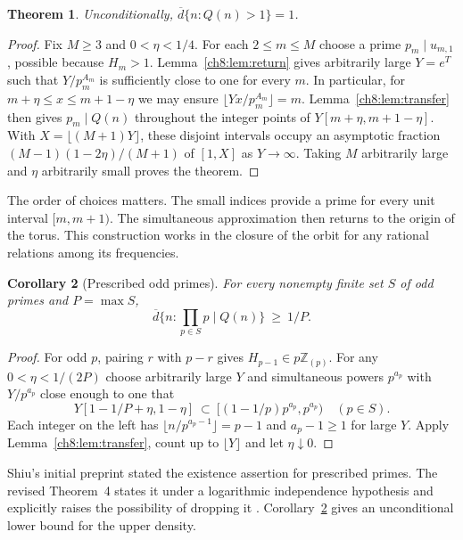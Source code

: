 \documentclass[11pt,a4paper,oneside,openany]{report}
\newtheorem{theorem}{Theorem}[section]
\newtheorem{corollary}[theorem]{Corollary}
\theoremstyle{remark}\newtheorem{remark}[theorem]{Remark}
\numberwithin{equation}{section}
\newcommand{\Z}{\mathbb Z}\newcommand{\N}{\mathbb N}
\newcommand{\dens}{\overline d}\newcommand{\lcm}{\operatorname{lcm}}
\begin{document}
\begin{theorem}\label{ch8:thm:wu}
Unconditionally, $\dens\{n:Q(n)>1\}=1$.
\end{theorem}
\begin{proof}
Fix $M\ge3$ and $0<\eta<1/4$. For each $2\le m\le M$ choose a prime $p_m\mid u_{m,1}$, possible because $H_m>1$. Lemma~\ref{ch8:lem:return} gives arbitrarily large $Y=e^T$ such that $Y/p_m^{A_m}$ is sufficiently close to one for every $m$. In particular, for $m+\eta\le x\le m+1-\eta$ we may ensure
$\lfloor Yx/p_m^{A_m}\rfloor=m$. Lemma~\ref{ch8:lem:transfer} then gives $p_m\mid Q(n)$ throughout the integer points of $Y[m+\eta,m+1-\eta]$. With $X=\lfloor(M+1)Y\rfloor$, these disjoint intervals occupy an asymptotic fraction $(M-1)(1-2\eta)/(M+1)$ of $[1,X]$ as $Y\to\infty$. Taking $M$ arbitrarily large and $\eta$ arbitrarily small proves the theorem.
\end{proof}

The order of choices matters. The small indices provide a prime for every unit interval $[m,m+1)$. The simultaneous approximation then returns to the origin of the torus. This construction works in the closure of the orbit for any rational relations among its frequencies.

\begin{corollary}[Prescribed odd primes]\label{ch8:cor:shiu}
For every nonempty finite set $S$ of odd primes and $P=\max S$,
\[
 \dens\{n:\textstyle\prod_{p\in S}p\mid Q(n)\}\ \ge\ 1/P .
\]
\end{corollary}
\begin{proof}
For odd $p$, pairing $r$ with $p-r$ gives $H_{p-1}\in p\Z_{(p)}$. For any $0<\eta<1/(2P)$ choose arbitrarily large $Y$ and simultaneous powers $p^{a_p}$ with $Y/p^{a_p}$ close enough to one that
\[
  Y[1-1/P+\eta,1-\eta]\ \subset\ [(1-1/p)p^{a_p},p^{a_p})
   \quad (p\in S).
\]
Each integer on the left has $\lfloor n/p^{a_p-1}\rfloor=p-1$ and $a_p-1\ge1$ for large $Y$. Apply Lemma~\ref{ch8:lem:transfer}, count up to $\lfloor Y\rfloor$ and let $\eta\downarrow0$.
\end{proof}
Shiu's initial preprint stated the existence assertion for prescribed primes. The revised Theorem~4 states it under a logarithmic independence hypothesis and explicitly raises the possibility of dropping it \cite{shiu}. Corollary~\ref{ch8:cor:shiu} gives an unconditional lower bound for the upper density.
\end{document}
